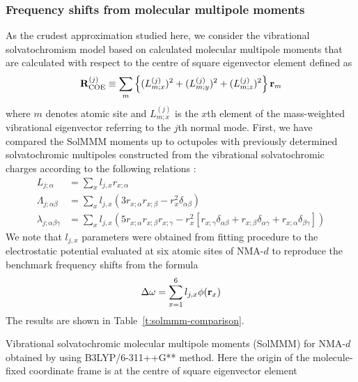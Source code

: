 \documentclass[a4paper,titlepage,twoside,fleqn,12pt]{book}
\begin{document}
\begin{refsection}
\subsubsection{Frequency shifts from molecular multipole moments}

As the crudest approximation studied here, we consider 
the vibrational solvatochromism model based on calculated
molecular multipole moments that are calculated with respect to
the centre of square eigenvector element
defined as
%
\begin{equation} \label{e:coe}
 {\bf R}_{\rm COE}^{(j)} \equiv 
 \sum_m \left\{ (L^{(j)}_{m;x})^2 + (L^{(j)}_{m;y})^2 + (L^{(j)}_{m;z})^2\right\} {\bf r}_m
\end{equation}
%
where $m$ denotes atomic site and $L^{(j)}_{m;x}$ is the $x$th
element of the mass\hyp{}weighted vibrational eigenvector
referring to the $j$th normal mode.
First, we have compared the SolMMM moments up to octupoles
with previously determined solvatochromic multipoles
constructed from the vibrational solvatochromic charges
according to the following relations \citep{Lee.Choi.Cho.JCP.2012}:
%
\begin{subequations}
\begin{align}
 L_{j;\alpha}                  &= \sum_x l_{j,x} r_{x;\alpha} \\
 \Lambda_{j;\alpha\beta}       &= \sum_x l_{j,x} \left( 3r_{x;\alpha}r_{x;\beta} - r_x^2 \delta_{\alpha\beta}\right) \\
 \lambda_{j;\alpha\beta\gamma} &= \sum_x l_{j,x}\left( 5r_{x;\alpha}r_{x;\beta}r_{x;\gamma} - r_x^2 \left[
                    r_{x;\gamma}\delta_{\alpha\beta} + r_{x;\beta}\delta_{\alpha\gamma} + r_{x;\alpha}\delta_{\beta\gamma}\right]\right)
\end{align}
\end{subequations}
%
We note that $l_{j,x}$ parameters were obtained from fitting procedure
to the electrostatic potential evaluated
at six atomic sites of NMA-$d$ to reproduce the benchmark frequency shifts 
from the formula
%
\begin{equation}
 \Delta\omega = \sum_{x=1}^6 l_{j,x} \phi({\bf r}_x)
\end{equation}
%
The results are shown in Table~\ref{t:solmmm-comparison}.
%
\begin{table}[t]
\caption{
Vibrational solvatochromic molecular multipole moments (SolMMM) 
for NMA-$d$ obtained by using 
B3LYP/6-311++G** method. Here the origin
of the molecule\hyp{}fixed coordinate frame is at the centre of 
square eigenvector element
}
\end{table}
\end{refsection}
\end{document}
